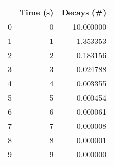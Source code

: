 \begin{tabular}{lrr}
\toprule
{} &  Time (s) &   Decays (\#) \\
\midrule
0 &         0 &    10.000000 \\
1 &         1 &     1.353353 \\
2 &         2 &     0.183156 \\
3 &         3 &     0.024788 \\
4 &         4 &     0.003355 \\
5 &         5 &     0.000454 \\
6 &         6 &     0.000061 \\
7 &         7 &     0.000008 \\
8 &         8 &     0.000001 \\
9 &         9 &     0.000000 \\
\bottomrule
\end{tabular}
